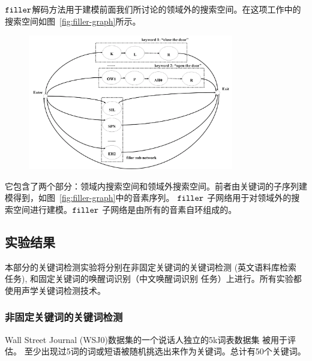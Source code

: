 $\tt filler$解码方法用于建模前面我们所讨论的领域外的搜索空间。在这项工作中的搜索空间如图~\ref{fig:filler-graph}所示。

\begin{figure}[!htp]
  \centering
    \captionstyle{\centering}
    \includegraphics[width=0.8\textwidth]{figure/filler-graph.png}
\end{figure}


它包含了两个部分：领域内搜索空间和领域外搜索空间。前者由关键词的子序列建模得到，如图~\ref{fig:filler-graph}中的音素序列。 $\tt filler$ 子网络用于对领域外的搜索空间进行建模。$\tt filler$ 子网络是由所有的音素自环组成的。


\subsection{实验结果}
\label{chap:kws-exp}


本部分的关键词检测实验将分别在非固定关键词的关键词检测 (英文语料库检索 任务), 和固定关键词的唤醒词识别（中文唤醒词识别 任务）上进行。所有实验都使用声学关键词检测技术。

\subsubsection{非固定关键词的关键词检测}
\label{Sec:exp-sp-docu-detri}

Wall Street Journal (WSJ0)数据集的一个说话人独立的5k词表数据集 \cite{garofalo1993continous} 被用于评估。 至少出现过5词的词或短语被随机挑选出来作为关键词。总计有50个关键词。

